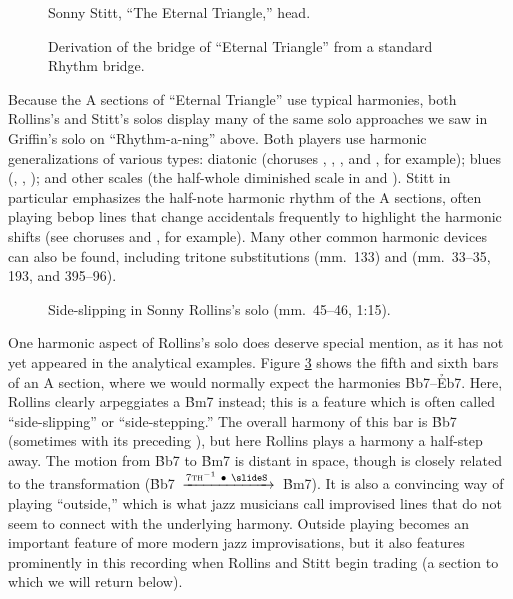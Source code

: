 \begin{figure}[tbp]
  \caption{Sonny Stitt, ``The Eternal Triangle,'' head.}
  \label{et:head-melody}
\end{figure}


\begin{figure}[tbp]
  \caption{Derivation of the bridge of ``Eternal Triangle'' from a standard
    Rhythm bridge.}
  \label{et:bridge-derivation}
\end{figure}

Because the A sections of ``Eternal Triangle'' use typical harmonies, both Rollins's
and Stitt's solos display many of the same solo approaches we saw in Griffin's solo
on ``Rhythm-a-ning'' above. Both players use harmonic
generalizations of various types: diatonic (choruses , ,
, and , for example); blues (, ,
); and other scales (the half-whole diminished scale in
 and ). Stitt in particular emphasizes the half-note
harmonic rhythm of the A sections, often playing bebop lines that change
accidentals frequently to highlight the harmonic shifts (see choruses
 and , for example). Many other common harmonic devices
can also be found, including tritone substitutions (mm.~133) and 
(mm.~33--35, 193, and 395--96).

\begin{figure}[tbp]
  \vspace{1em}
  \caption[Side-slipping in Sonny Rollins's solo.]{%
    Side-slipping in Sonny Rollins's solo (mm.~45--46, 1:15).}
  \label{et:sr-side-slipping}
\end{figure}

One harmonic aspect of Rollins's solo does deserve special mention, as it has
not yet appeared in the analytical examples. Figure \ref{et:sr-side-slipping}
shows the fifth and sixth bars of an A section, where we would normally expect
the harmonies \h{Bb7}--\h{Eb7}. Here, Rollins clearly arpeggiates a \h{Bm7}
instead; this is a feature which is often called ``side-slipping'' or
``side-stepping.'' The overall harmony of this bar is \h{Bb7}
(sometimes with its preceding \ii), but here Rollins plays a harmony a half-step
away. The motion from \h{Bb7} to \h{Bm7} is distant in \tf space, though is
closely related to the \slideS transformation \mbox{(\h{Bb7}
  $\xrightarrow{7\text{\textsc{th}}^{-1}\ \bullet\ \text{\slideS}\,}$
  \h{Bm7})}. It is also a convincing way of playing ``outside,''
which is what jazz musicians call improvised lines that do not seem to connect
with the underlying harmony. Outside playing becomes an important
feature of more modern jazz improvisations, but it also features prominently
in this recording when Rollins and Stitt begin trading (a section to which we
will return below).

